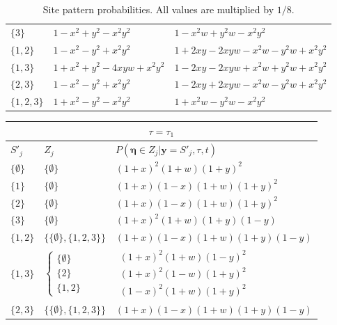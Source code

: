 \documentclass[a4paper]{article}
\newcommand{\alignmentColumn}{\mathbf{y}}
\newcommand{\siteSplit}{S'}
\newcommand{\ancestralStateColumn}{\boldsymbol\eta}
\newcommand{\ancestralStateCategory}{Z}
\begin{document}
\begin{table}
\begin{tabular}{|l|l|l|}
    $\{3\}$        &$1-x^2+y^2-x^2y^2$&$1-x^2w+y^2w-x^2y^2$\\
    $\{1,2\}$      &$1-x^2-y^2+x^2y^2$&$1+2xy-2xyw-x^2w-y^2w+x^2y^2$\\
    $\{1,3\}$      &$1+x^2+y^2-4xyw+x^2y^2$&$1-2xy-2xyw+x^2w+y^2w+x^2y^2$\\
    $\{2,3\}$      &$1-x^2-y^2+x^2y^2$&$1-2xy+2xyw-x^2w-y^2w+x^2y^2$\\
    $\{1,2,3\}$    &$1+x^2-y^2-x^2y^2$&$1+x^2w-y^2w-x^2y^2$\\
    \hline
\end{tabular}
\caption{Site pattern probabilities.
All values are multiplied by $1/8$.}
\label{tab:sitepatprob}
\end{table}

\begin{table}
\centering
\begin{tabular}{|l|ll|}
    \multicolumn{3}{c}{$\tau=\tau_1$}\\
    \hline
    $\siteSplit_j$    & $\ancestralStateCategory_j$ & $P(\ancestralStateColumn\in\ancestralStateCategory_j|\alignmentColumn=\siteSplit_j,\tau,t)$\\
    \hline
    $\{\emptyset\}$&
    $\{\emptyset\}$&
    $(1+x)^2   (1+w)(1+y)^2$\\
     $\{1\}$    &
    $\{\emptyset\}$&
    $(1+x)(1-x)(1+w)(1+y)^2$\\
     $\{2\}$    &
    $\{\emptyset\}$&
    $(1+x)(1-x)(1+w)(1+y)^2$\\
     $\{3\}$    &
    $\{\emptyset\}$&
    $(1+x)^2   (1+w)(1+y)(1-y)$\\
    $\{1,2\}$  &
    $\{\{\emptyset\},\{1,2,3\}\}$&
    $(1+x)(1-x)(1+w)(1+y)(1-y)$\\
    $\{1,3\}$  &
    $\left\{\begin{array}{l}
                    \{\emptyset\}\\
                    \{2\}\\
                    \{1,2\}
                \end{array}\right.$&
    $\begin{array}{l}
                    (1+x)^2   (1+w)(1-y)^2\\
                    (1+x)^2   (1-w)(1+y)^2\\
                    (1-x)^2   (1+w)(1+y)^2
                \end{array}$\\
    $\{2,3\}$  &
                $\{\{\emptyset\},\{1,2,3\}\}$&
                $(1+x)(1-x)(1+w)(1+y)(1-y)$\\

\end{tabular}
\end{table}
\end{document}
